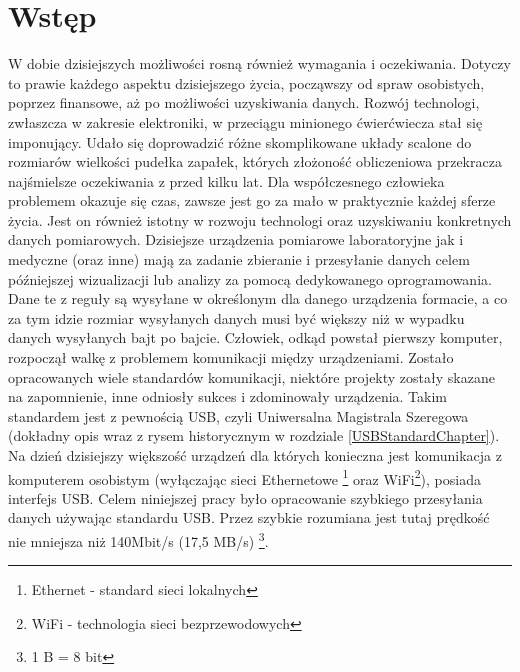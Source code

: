 \documentclass{BscUS}
\begin{document}
\chapter{Wstęp}
\label{beginChapter}
\pagestyle{fancy}
W dobie dzisiejszych możliwości rosną również wymagania i oczekiwania. Dotyczy to prawie każdego aspektu dzisiejszego życia, począwszy od spraw osobistych, poprzez finansowe, aż po możliwości uzyskiwania danych. Rozwój technologi, zwłaszcza w zakresie elektroniki, w przeciągu minionego ćwierćwiecza stał się imponujący. Udało się doprowadzić różne skomplikowane układy scalone do rozmiarów wielkości pudełka zapałek, których złożoność obliczeniowa przekracza najśmielsze oczekiwania z przed kilku lat. Dla współczesnego człowieka problemem okazuje się czas, zawsze jest go za mało w praktycznie każdej sferze życia. Jest on również istotny w rozwoju technologi oraz uzyskiwaniu konkretnych danych pomiarowych.
\newline
\indent Dzisiejsze urządzenia pomiarowe laboratoryjne jak i medyczne (oraz inne) mają za zadanie zbieranie i przesyłanie danych celem późniejszej wizualizacji lub analizy za pomocą dedykowanego oprogramowania. Dane te z reguły są wysyłane w określonym dla danego urządzenia formacie, a co za tym idzie rozmiar wysyłanych danych musi być większy niż w wypadku danych wysyłanych bajt po bajcie.
\newline
\indent Człowiek, odkąd powstał pierwszy komputer, rozpoczął walkę z problemem komunikacji między urządzeniami. Zostało opracowanych wiele standardów komunikacji, niektóre projekty zostały skazane na zapomnienie, inne odniosły sukces i zdominowały urządzenia. Takim standardem jest z pewnością USB, czyli Uniwersalna Magistrala Szeregowa (dokładny opis wraz z rysem historycznym w rozdziale \ref{USBStandardChapter}). Na dzień dzisiejszy większość urządzeń dla których konieczna jest komunikacja z komputerem osobistym (wyłączając sieci Ethernetowe \footnote{Ethernet - standard sieci lokalnych} oraz WiFi\footnote{WiFi - technologia sieci bezprzewodowych}), posiada interfejs USB.
\newline
\indent Celem niniejszej pracy było opracowanie szybkiego przesyłania danych używając standardu USB. Przez szybkie rozumiana jest tutaj prędkość nie mniejsza niż 140Mbit/s (17,5 MB/s) \footnote{1 B = 8 bit}.
\newline
\end{document}
